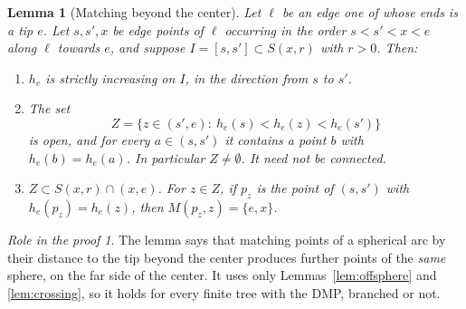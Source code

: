 \documentclass[11pt]{amsart}
\newtheorem{lemma}[theorem]{Lemma}
\theoremstyle{definition}
\theoremstyle{remark}
\newtheorem*{role}{Role in the proof}
\newcommand{\M}{M}
\begin{document}
\begin{lemma}[Matching beyond the center]\label{lem:matching}
Let $\ell$ be an edge one of whose ends is a tip $e$. Let $s,s',x$ be edge points of $\ell$ occurring in the order $s<s'<x<e$ along $\ell$ towards $e$, and suppose $I=[s,s']\subset S(x,r)$ with $r>0$. Then:
\begin{enumerate}[label=\textup{(\alph*)}]
\item $h_e$ is strictly increasing on $I$, in the direction from $s$ to $s'$.
\item The set
\[
  Z=\{z\in(s',e):\ h_e(s)<h_e(z)<h_e(s')\}
\]
is open, and for every $a\in(s,s')$ it contains a point $b$ with $h_e(b)=h_e(a)$. In particular $Z\ne\emptyset$. It need not be connected.
\item $Z\subset S(x,r)\cap(x,e)$. For $z\in Z$, if $p_z$ is the point of $(s,s')$ with $h_e(p_z)=h_e(z)$, then $\M(p_z,z)=\{e,x\}$.
\end{enumerate}
\end{lemma}

\begin{role}
The lemma says that matching points of a spherical arc by their distance to the tip beyond the center produces further points of the \emph{same} sphere, on the far side of the center. It uses only Lemmas~\ref{lem:offsphere} and \ref{lem:crossing}, so it holds for every finite tree with the DMP, branched or not.
\end{role}
\end{document}
